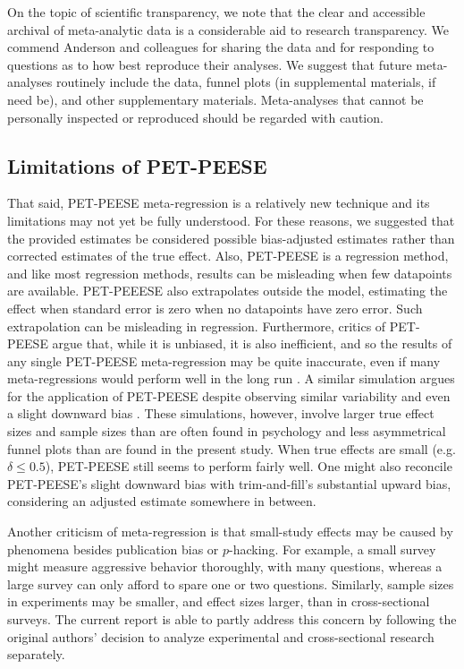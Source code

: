 \documentclass[man]{apa6}
\begin{document}
On the topic of scientific transparency, we note that the clear and accessible archival of meta-analytic data is a considerable aid to research transparency. We commend Anderson and colleagues for sharing the data and for responding to questions as to how best reproduce their analyses. We suggest that future meta-analyses routinely include the data, funnel plots (in supplemental materials, if need be), and other supplementary materials. Meta-analyses that cannot be personally inspected or reproduced should be regarded with caution.

\subsection{Limitations of PET-PEESE}
That said, PET-PEESE meta-regression is a relatively new technique and its limitations may not yet be fully understood. For these reasons, we suggested that the provided estimates be considered possible bias-adjusted estimates rather than corrected estimates of the true effect. Also, PET-PEESE is a regression method, and like most regression methods, results can be misleading when few datapoints are available. PET-PEEESE also extrapolates outside the model, estimating the effect when standard error is zero when no datapoints have zero error. Such extrapolation can be misleading in regression. 
Furthermore, critics of PET-PEESE argue that, while it is unbiased, it is also inefficient, and so the results of any single PET-PEESE meta-regression may be quite inaccurate, even if many meta-regressions would perform well in the long run \citep{Reed:etal:WORKINGPAPER}. A similar simulation argues for the application of PET-PEESE despite observing similar variability and even a slight downward bias \citep{Moreno:etal:206}. These simulations, however, involve larger true effect sizes and sample sizes than are often found in psychology and less asymmetrical funnel plots than are found in the present study. When true effects are small (e.g. $\delta \le 0.5$), PET-PEESE still seems to perform fairly well. One might also reconcile PET-PEESE's slight downward bias with trim-and-fill's substantial upward bias, considering an adjusted estimate somewhere in between.

Another criticism of meta-regression is that small-study effects may be caused by phenomena besides publication bias or $p$-hacking. For example, a small survey might measure aggressive behavior thoroughly, with many questions, whereas a large survey can only afford to spare one or two questions. Similarly, sample sizes in experiments may be smaller, and effect sizes larger, than in cross-sectional surveys. The current report is able to partly address this concern by following the original authors' decision to analyze experimental and cross-sectional research separately.
\end{document}
